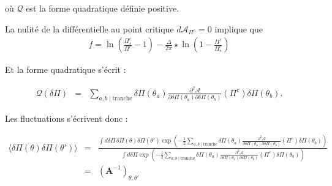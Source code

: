 où $\mathcal{Q}$ est la forme quadratique définie positive.

\begin{figure}[H]
	\centering 
	\captionsetup{skip=10pt} %
\end{figure}

\begin{aff}
La nulité de la différentielle au point critique $d\mathcal{A}_{\Pi^c} =0$ implique que  
\begin{eqnarray*}
	f =  \ln \left ( \frac{ \Pi_s^c}{\Pi^c} -1 \right )  - \frac{\Delta}{2\pi} \star  \ln \left ( 1 - \frac{\Pi^c}{\Pi_s^c} \right )		
\end{eqnarray*}
\end{aff}

Et la forme quadratique s’écrit :

\begin{eqnarray*}
    \mathcal{Q}(\delta \Pi ) &=&  \sum_{a,b \mid \text{tranche}}  
    \delta \Pi(\theta_a)  \frac{\partial^2 \mathcal{A}}{\partial \delta \Pi(\theta_a) \partial \delta \Pi(\theta_b) } (\Pi^c)  \delta \Pi(\theta_b).
\end{eqnarray*}

Les fluctuations s’écrivent donc :

\begin{eqnarray*}
    \langle \delta \Pi ( \theta) \delta \Pi ( \theta') \rangle &=&  
    \frac{ \int d\delta \Pi \, \delta \Pi(\theta) \delta \Pi ( \theta') 
    \exp \left( - \frac{1}{2} \sum_{a,b \mid \text{tranche}}  
    \delta \Pi(\theta_a) \frac{\partial^2 \mathcal{A}}{\partial \delta \Pi(\theta_a) \partial \delta \Pi(\theta_b) } (\Pi^c)  \delta \Pi(\theta_b) \right) }
    { \int d\delta \Pi  
    \exp \left( - \frac{1}{2} \sum_{a,b \mid \text{tranche}}  
    \delta \Pi(\theta_a) \frac{\partial^2 \mathcal{A}}{\partial \delta \Pi(\theta_a) \partial \delta \Pi(\theta_b) } (\Pi^c)  \delta \Pi(\theta_b) \right) } \\
    &=& \left( \mathbf{A}^{-1} \right)_{\theta , \theta'}
\end{eqnarray*}

